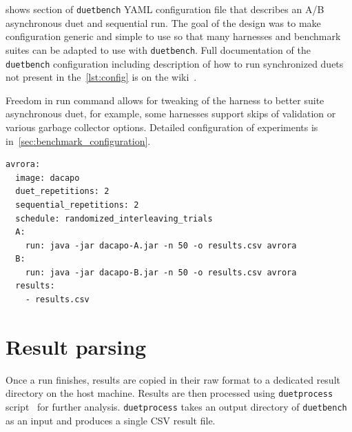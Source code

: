 shows section of \lstinline{duetbench} YAML configuration file that describes an A/B asynchronous duet and sequential run.
The goal of the design was to make configuration generic and simple to use so that many harnesses and benchmark suites can be adapted to use with \lstinline{duetbench}.
Full documentation of the \lstinline{duetbench} configuration including description of how to run synchronized duets not present in the~\cref{lst:config} is on the wiki~\cite{wiki}.

Freedom in run command allows for tweaking of the harness to better suite asynchronous duet, for example, some harnesses support skips of validation or various garbage collector options.
Detailed configuration of experiments is in~\cref{sec:benchmark_configuration}.

\begin{listing}
    \begin{lstlisting}
avrora:
  image: dacapo
  duet_repetitions: 2
  sequential_repetitions: 2
  schedule: randomized_interleaving_trials
  A:
    run: java -jar dacapo-A.jar -n 50 -o results.csv avrora
  B:
    run: java -jar dacapo-B.jar -n 50 -o results.csv avrora
  results:
    - results.csv
    \end{lstlisting}
    \caption{
        Example part of YAML configuration file for \lstinline{duetbench} that runs \lstinline{avrora} benchmark from the DaCapo suite.
        In this case, both A and B versions are packaged in a single container image as Java JAR archives.
        Run command specifies how to invoke the DaCapo harness --- 50 iterations, results in \lstinline{results.csv} and run only \lstinline{avrora} benchmark.
        All the result files or directories need to be specified in \lstinline{results} array field.
        Note the correspondence between user input fields from this configuration and parameters in angled brackets from~\cref{fig:duetbench_sequence}.
        Furthermore, users can specify the number of repetitions for both asynchronous duet and sequential measurements, as well as the scheduling strategy for those runs.
    }
    \label{lst:config}
\end{listing}

\section{Result parsing}
\label{sec:result_parsing}

Once a run finishes, results are copied in their raw format to a dedicated result directory on the host machine.
Results are then processed using \lstinline{duetprocess} script~\cite{wiki} for further analysis.
\lstinline{duetprocess} takes an output directory of \lstinline{duetbench} as an input and produces a single CSV result file.

